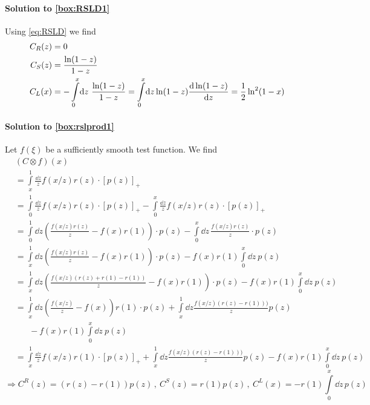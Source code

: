 \paragraph{Solution to \cref{box:RSLD1}}
Using \cref{eq:RSLD} we find
\begin{align}
    C_R(z) &= 0\\
    C_S(z) &= \frac{\ln(1-z)}{1-z}\\
    C_L(x) &= -\int\limits_0^x\! \dd z ~ \frac{\ln(1-z)}{1-z} = \int\limits_0^x\! \dd z \ln(1-z) \dv {\ln(1-z)} {z} = \frac 1 2 \ln^2(1-x)
\end{align}

\paragraph{Solution to \cref{box:rslprod1}}
Let $f(\xi)$ be a sufficiently smooth test function. We find
\begin{align}
    &(C\otimes f)(x)\nonumber\\
    &= \int\limits_x^1 \frac{\dd z}{z} f(x/z) r(z) \cdot \left[ p(z) \right]_+\\
    &= \int\limits_0^1 \frac{\dd z}{z} f(x/z) r(z) \cdot \left[ p(z) \right]_+ - \int\limits_0^x \frac{\dd z}{z} f(x/z) r(z) \cdot \left[ p(z) \right]_+\\
    &= \int\limits_0^1\! \dd z \left(\frac{f(x/z)r(z)}{z} - f(x)r(1)\right) \cdot p(z) - \int\limits_0^x\!\dd z\, \frac{ f(x/z) r(z)}{z} \cdot p(z)\\
    &= \int\limits_x^1\! \dd z \left(\frac{f(x/z)r(z)}{z} - f(x)r(1)\right) \cdot p(z) - f(x) r(1) \int\limits_0^x\dd z~ p(z)\\
    &= \int\limits_x^1\! \dd z \left(\frac{f(x/z)(r(z)+r(1)-r(1))}{z} - f(x)r(1)\right) \cdot p(z) - f(x) r(1) \int\limits_0^x\dd z~ p(z)\\
    &= \int\limits_x^1\! \dd z \left(\frac{f(x/z)}{z} - f(x)\right) r(1)\cdot p(z) + \int\limits_x^1\! \dd z \frac{f(x/z)(r(z)-r(1)))}{z} p(z) \nonumber\\
    &\hspace{20pt}  - f(x) r(1) \int\limits_0^x\!\dd z~ p(z)\\
    &= \int\limits_x^1 \frac{\dd z}{ z} f(x/z)  r(1)\cdot \left[p(z)\right]_+ + \int\limits_x^1\! \dd z \frac{f(x/z)(r(z)-r(1)))}{z} p(z) - f(x) r(1) \int\limits_0^x\!\dd z~ p(z)
\end{align}
\begin{equation}
    \Rightarrow C^R(z) = (r(z)-r(1))p(z)\,,~  C^S(z) = r(1)p(z)\,,~ C^L(x) = -r(1)\int\limits_0^x\!\dd z\, p(z)
\end{equation}

